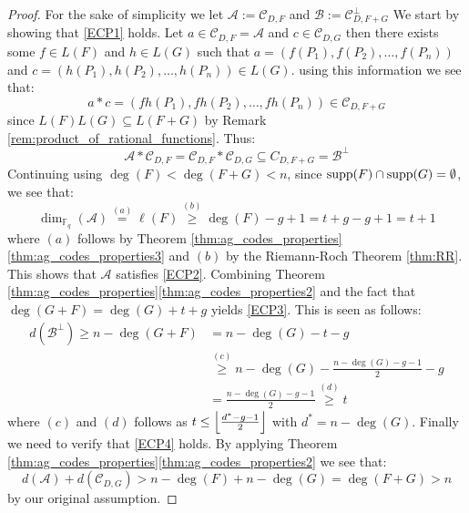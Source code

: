 \begin{proof}
  For the sake of simplicity we let $\mathcal{A} := \mathcal{C}_{D, F}$ and $\mathcal{B} := \mathcal{C}_{D, F + G}^{\perp}$
  We start by showing that \ref{ECP1} holds. Let $a \in \mathcal{C}_{D, F} = \mathcal{A}$ and $c  \in \mathcal{C}_{D, G}$ then there exists some $f \in L(F)$ and $h \in L(G)$ such that $a =(f(P_{1}), f(P_2), \ldots, f(P_{n}))$ and $c = (h(P_{1}), h(P_2), \ldots, h(P_{n})) \in L(G)$.
  using this information we see that:
  \begin{equation*}
    a * c = (fh(P_1), fh(P_2), \ldots, fh(P_{n})) \in \mathcal{C}_{D, F + G}
  \end{equation*}
  since $L(F)L(G) \subseteq L(F + G)$ by Remark \ref{rem:product_of_rational_functions}. Thus:
  \begin{equation*}
  \mathcal{A} * \mathcal{C}_{D, F} = \mathcal{C}_{D, F} * \mathcal{C}_{D, G} \subseteq C_{D, F + G} = \mathcal{B}^{\perp}
  \end{equation*}
  Continuing using $\deg(F) < \deg(F + G) < n$, since $\textnormal{supp}(F) \cap \textnormal{supp}(G) = \emptyset$, we see that:
  \begin{equation*}
    \dim_{\mathbb{F}_q}(\mathcal{A}) \stackrel{(a)}{=} \ell(F) \stackrel{(b)}{\geq} \deg(F) - g + 1 = t + g - g + 1 = t + 1
  \end{equation*}
  where $(a)$ follows by Theorem \ref{thm:ag_codes_properties}\ref{thm:ag_codes_properties3} and $(b)$ by the Riemann-Roch Theorem \ref{thm:RR}. This shows that $\mathcal{A}$ satisfies \ref{ECP2}. Combining Theorem \ref{thm:ag_codes_properties}\ref{thm:ag_codes_properties2} and the fact that $\deg(G + F) = \deg(G) + t + g$ yields  \ref{ECP3}. This is seen as follows:
  \begin{align*}
    d(\mathcal{B}^{\perp}) \geq n - \deg(G + F) &= n - \deg(G) - t - g\\ &\stackrel{(c)}\geq n - \deg(G) - \frac{n - \deg(G) - g - 1}{2} - g \\ &= \frac{n - \deg(G) - g - 1}{2} \stackrel{(d)}{\geq} t
  \end{align*}
  where $(c)$ and $(d)$ follows as $t \leq \left\lfloor\frac{d^{*} - g - 1}{2}\right\rfloor$ with $d^{*} = n - \deg(G)$. Finally we need to verify that \ref{ECP4} holds. By applying Theorem \ref{thm:ag_codes_properties}\ref{thm:ag_codes_properties2} we see that:
  \begin{equation*}
    d(\mathcal{A}) + d(\mathcal{C}_{D, G}) > n - \deg(F) + n - \deg(G) = \deg(F + G) > n
  \end{equation*}
  by our original assumption.
\end{proof}
